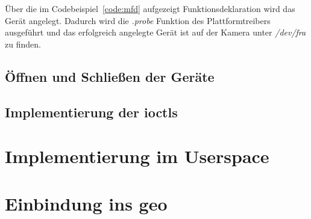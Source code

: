 Über die im Codebeispiel~\ref{code:mfd} aufgezeigt Funktionsdeklaration wird das Gerät angelegt. Dadurch wird die \textit{.probe} Funktion des Plattformtreibers ausgeführt und das erfolgreich angelegte Gerät ist auf der Kamera unter \textit{/dev/fra} zu finden.


\subsection{Öffnen und Schließen der Geräte}
\subsection{Implementierung der \acl{ioctl}s}



\section{Implementierung im Userspace}\label{sec:user}


\section{Einbindung ins \acl{geo}}\label{sec:soft}










